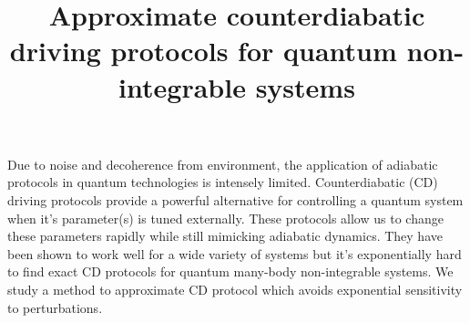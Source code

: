 \documentclass[11pt,a4paper]{article}
\title{Approximate counterdiabatic driving protocols for quantum non-integrable systems  }
\begin{document}
\maketitle


Due to noise and decoherence from environment, the application of adiabatic protocols in quantum technologies is intensely limited. Counterdiabatic (CD) driving protocols provide a powerful alternative for controlling a quantum system when it's parameter(s) is tuned externally. These protocols allow us to change these parameters rapidly while still mimicking adiabatic dynamics. They have been shown to work well for a wide variety of systems but it's exponentially hard to find exact CD protocols for quantum many-body non-integrable systems. We study a method to approximate CD protocol which avoids exponential sensitivity to perturbations.


 



 


%
\end{document}
